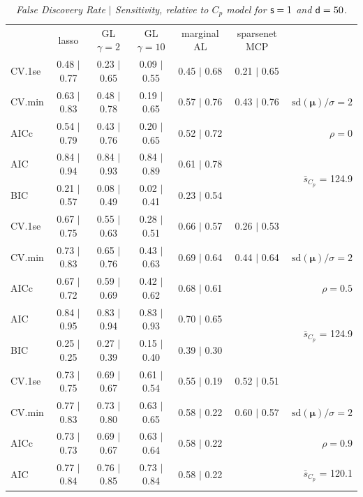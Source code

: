 \documentclass[12pt]{article}
\newcommand{\mr}[1]{\mathrm{#1}}
\newcommand{\bm}[1]{\mathbf{#1}}
\begin{document}
\begin{table}[p]\vspace{-.5cm}
\caption[l]{\it False Discovery Rate $\mid$ Sensitivity, relative to $C_p$ model  for ${\sf s}=1$ and ${\sf d}=50$.}
\vspace{-.5cm}
\small{}
\begin{center}
\begin{tabular}{l*{5}{c}|r}
 & lasso & GL $\gamma=2$ & GL $\gamma=10$ & marginal AL & sparsenet MCP  & \\
 \cline{1-7}
CV.1se & 0.48 $\mid$ 0.77 & 0.23 $\mid$ 0.65 & 0.09 $\mid$ 0.55 & 0.45 $\mid$ 0.68 & 0.21 $\mid$ 0.65 &\\
CV.min & 0.63 $\mid$ 0.83 & 0.48 $\mid$ 0.78 & 0.19 $\mid$ 0.65 & 0.57 $\mid$ 0.76 & 0.43 $\mid$ 0.76 &  $\mr{sd}(\bm{\mu})/\sigma=2$ \\
AICc & 0.54 $\mid$ 0.79 & 0.43 $\mid$ 0.76 & 0.20 $\mid$ 0.65 & 0.52 $\mid$ 0.72 & & $\rho=0$ \\
AIC & 0.84 $\mid$ 0.94 & 0.84 $\mid$ 0.93 & 0.84 $\mid$ 0.89 & 0.61 $\mid$ 0.78 & & \multirow{2}{*}{$\bar{s}_{C_p}$ = 124.9} \\
BIC & 0.21 $\mid$ 0.57 & 0.08 $\mid$ 0.49 & 0.02 $\mid$ 0.41 & 0.23 $\mid$ 0.54 & & \\
 \hline 
CV.1se & 0.67 $\mid$ 0.75 & 0.55 $\mid$ 0.63 & 0.28 $\mid$ 0.51 & 0.66 $\mid$ 0.57 & 0.26 $\mid$ 0.53 &\\
CV.min & 0.73 $\mid$ 0.83 & 0.65 $\mid$ 0.76 & 0.43 $\mid$ 0.63 & 0.69 $\mid$ 0.64 & 0.44 $\mid$ 0.64 &  $\mr{sd}(\bm{\mu})/\sigma=2$ \\
AICc & 0.67 $\mid$ 0.72 & 0.59 $\mid$ 0.69 & 0.42 $\mid$ 0.62 & 0.68 $\mid$ 0.61 & & $\rho=0.5$ \\
AIC & 0.84 $\mid$ 0.95 & 0.83 $\mid$ 0.94 & 0.83 $\mid$ 0.93 & 0.70 $\mid$ 0.65 & & \multirow{2}{*}{$\bar{s}_{C_p}$ = 124.9} \\
BIC & 0.25 $\mid$ 0.25 & 0.27 $\mid$ 0.39 & 0.15 $\mid$ 0.40 & 0.39 $\mid$ 0.30 & & \\
 \hline 
CV.1se & 0.73 $\mid$ 0.75 & 0.69 $\mid$ 0.67 & 0.61 $\mid$ 0.54 & 0.55 $\mid$ 0.19 & 0.52 $\mid$ 0.51 &\\
CV.min & 0.77 $\mid$ 0.83 & 0.73 $\mid$ 0.80 & 0.63 $\mid$ 0.65 & 0.58 $\mid$ 0.22 & 0.60 $\mid$ 0.57 &  $\mr{sd}(\bm{\mu})/\sigma=2$ \\
AICc & 0.73 $\mid$ 0.73 & 0.69 $\mid$ 0.67 & 0.63 $\mid$ 0.64 & 0.58 $\mid$ 0.22 & & $\rho=0.9$ \\
AIC & 0.77 $\mid$ 0.84 & 0.76 $\mid$ 0.85 & 0.73 $\mid$ 0.84 & 0.58 $\mid$ 0.22 & & \multirow{2}{*}{$\bar{s}_{C_p}$ = 120.1} \\

\end{tabular}
\end{center}
\end{table}
\end{document}

